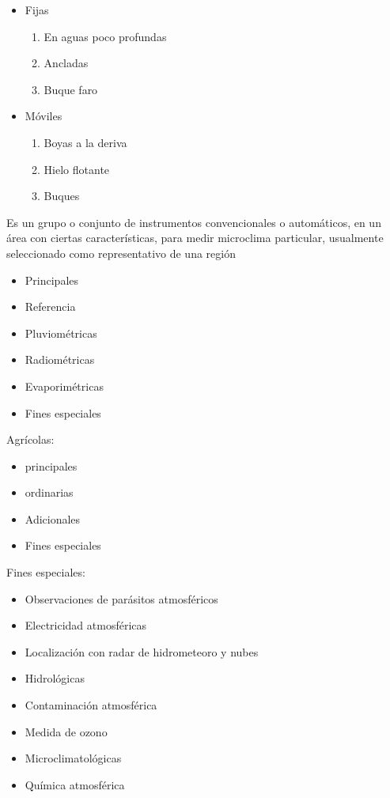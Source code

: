\begin{itemize}
\begin{itemize}
\begin{itemize}
\begin{itemize}
                \item Fijas \begin{enumerate}
                    \item En aguas poco profundas
                    \item Ancladas
                    \item Buque faro
                \end{enumerate}
                \item Móviles\begin{enumerate}
                    \item Boyas a la deriva
                    \item Hielo flotante
                    \item Buques
                \end{enumerate}
            \end{itemize}
        \end{itemize}
    \end{itemize}
      \end{itemize}

\begin{definition}
    Es un grupo o conjunto de instrumentos convencionales o automáticos, en un área con ciertas características, para medir microclima particular, usualmente seleccionado como representativo de una región
\end{definition}

\begin{itemize}
    \item Principales
    \item Referencia
    \item Pluviométricas
    \item Radiométricas
    \item Evaporimétricas
    \item Fines especiales
\end{itemize}

Agrícolas:
\begin{itemize}
    \item principales
    \item ordinarias
    \item Adicionales
    \item Fines especiales
\end{itemize}

Fines especiales:
\begin{itemize}
    \item Observaciones de parásitos atmosféricos
    \item Electricidad atmosféricas
    \item Localización con radar de hidrometeoro y nubes
    \item Hidrológicas
    \item Contaminación atmosférica
    \item Medida de ozono
    \item Microclimatológicas
    \item Química atmosférica
\end{itemize}


